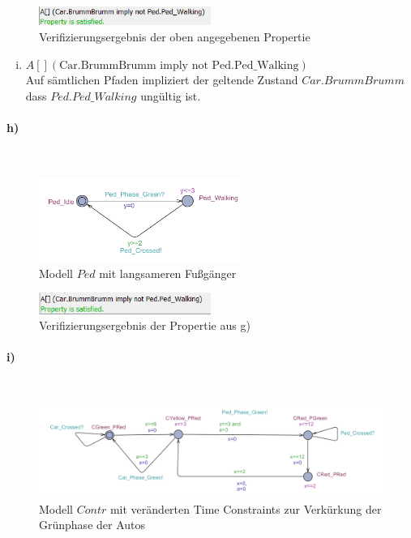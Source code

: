\begin{figure}[H] 
	\centering 
	\includegraphics[width=0.5\textwidth]{./UPAAAL_Screens/2g-Verified}
	\caption[Aufgabe 2f)]{Verifizierungsergebnis der oben angegebenen Propertie}    
\end{figure}

\begin{enumerate}[i)]
	\item $A \left[\right] (\text{Car.BrummBrumm} \text{ imply not } \text{Ped.Ped\_Walking}) $\\
	Auf sämtlichen Pfaden impliziert der geltende Zustand $Car.BrummBrumm$ dass $Ped.Ped\_Walking$ ungültig ist.
\end{enumerate}

\paragraph{h)}\mbox{} \\

\begin{figure}[H] 
	\centering 
	\includegraphics[width=0.6\textwidth]{./UPAAAL_Screens/2h_Graph}
	\caption[Aufgabe 2h)]{Modell $Ped$ mit langsameren Fußgänger}    
\end{figure} 

\begin{figure}[H] 
	\centering 
	\includegraphics[width=0.5\textwidth]{./UPAAAL_Screens/2h_Verification}
	\caption[Aufgabe 2h)]{Verifizierungsergebnis der Propertie aus g)}    
\end{figure}

\paragraph{i)}\mbox{} \\

\begin{figure}[H] 
	\centering 
	\includegraphics[width=\textwidth]{./UPAAAL_Screens/Contr1}
	\caption[Aufgabe 2i)]{Modell $Contr$ mit veränderten Time Constraints zur Verkürkung der Grünphase der Autos}    
\end{figure}

